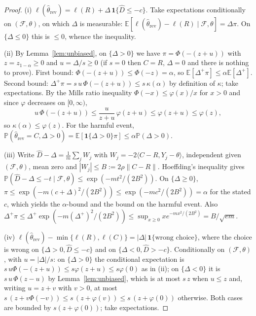 \documentclass[10pt,a4paper]{article}
\theoremstyle{plain}
\theoremstyle{definition}
\theoremstyle{remark}
\newcommand{\E}{\mathbb{E}}
\newcommand{\Prob}{\mathbb{P}}
\newcommand{\Dh}{\widehat{D}}
\newcommand{\rev}{\mathrm{rev}}
\newcommand{\norm}[1]{\lVert #1\rVert}
\newcommand{\ip}[1]{\langle #1\rangle}
\begin{document}
\begin{proof}
(i) $\ell(\hat\theta_\rev)=\ell(R)+\Delta\,\mathbf 1\{\Dh\le-c\}$. Take expectations conditionally on $(\mathcal F,\theta)$, on which $\Delta$ is measurable: $\E[\ell(\hat\theta_\rev)-\ell(R)\mid\mathcal F,\theta]=\Delta\pi$. On $\{\Delta\le0\}$ this is $\le0$, whence the inequality.

(ii) By Lemma~\ref{lem:unbiased}, on $\{\Delta>0\}$ we have $\pi=\Phi(-(z+u))$ with $z=z_{1-\alpha}\ge0$ and $u=\Delta/s\ge0$ (if $s=0$ then $C=R$, $\Delta=0$ and there is nothing to prove). First bound: $\Phi(-(z+u))\le\Phi(-z)=\alpha$, so $\E[\Delta^+\pi]\le\alpha\E[\Delta^+]$. Second bound: $\Delta^+\pi=s\,u\,\Phi(-(z+u))\le s\,\kappa(\alpha)$ by definition of $\kappa$; take expectations. By the Mills ratio inequality $\Phi(-x)\le\varphi(x)/x$ for $x>0$ and since $\varphi$ decreases on $[0,\infty)$,
\[
u\,\Phi(-(z+u))\le \frac{u}{z+u}\,\varphi(z+u)\le \varphi(z+u)\le \varphi(z),
\]
so $\kappa(\alpha)\le\varphi(z)$. For the harmful event, $\Prob(\hat\theta_\rev=C,\Delta>0)=\E[\mathbf 1\{\Delta>0\}\pi]\le\alpha\Prob(\Delta>0)$.

(iii) Write $\Dh-\Delta=\frac1m\sum_j W_j$ with $W_j=-2\ip{C-R,Y_j-\theta}$, independent given $(\mathcal F,\theta)$, mean zero and $|W_j|\le B:=2\rho\norm{C-R}$. Hoeffding's inequality \citep{hoeffding1963} gives $\Prob(\Dh-\Delta\le-t\mid\mathcal F,\theta)\le\exp(-mt^2/(2B^2))$. On $\{\Delta\ge0\}$, $\pi\le\exp(-m(c+\Delta)^2/(2B^2))\le\exp(-mc^2/(2B^2))=\alpha$ for the stated $c$, which yields the $\alpha$-bound and the bound on the harmful event. Also $\Delta^+\pi\le\Delta^+\exp(-m(\Delta^+)^2/(2B^2))\le\sup_{x\ge0}x e^{-mx^2/(2B^2)}=B/\sqrt{em}$.

(iv) $\ell(\hat\theta_\rev)-\min\{\ell(R),\ell(C)\}=|\Delta|\,\mathbf 1\{\text{wrong choice}\}$, where the choice is wrong on $\{\Delta>0,\Dh\le-c\}$ and on $\{\Delta<0,\Dh>-c\}$. Conditionally on $(\mathcal F,\theta)$, with $u=|\Delta|/s$: on $\{\Delta>0\}$ the conditional expectation is $s\,u\Phi(-(z+u))\le s\varphi(z+u)\le s\varphi(0)$ as in (ii); on $\{\Delta<0\}$ it is $s\,u\,\Phi(z-u)$ by Lemma~\ref{lem:unbiased}, which is at most $s\,z$ when $u\le z$ and, writing $u=z+v$ with $v>0$, at most $s\,(z+v\Phi(-v))\le s\,(z+\varphi(v))\le s\,(z+\varphi(0))$ otherwise. Both cases are bounded by $s(z+\varphi(0))$; take expectations.
\end{proof}
\end{document}
